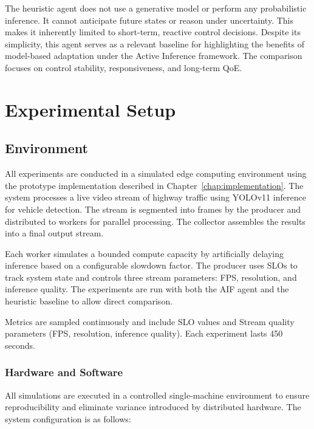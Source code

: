 The heuristic agent does not use a generative model or perform any probabilistic inference. It cannot anticipate future states or reason under uncertainty. This makes it inherently limited to short-term, reactive control decisions. Despite its simplicity, this agent serves as a relevant baseline for highlighting the benefits of model-based adaptation under the Active Inference framework. The comparison focuses on control stability, responsiveness, and long-term QoE.

\section{Experimental Setup}
\label{sec:evaluation-setup}

\subsection{Environment}
\label{sec:evaluation-environment}

All experiments are conducted in a simulated edge computing environment using the prototype implementation described in Chapter~\ref{chap:implementation}. The system processes a live video stream of highway traffic using YOLOv11 inference for vehicle detection. The stream is segmented into frames by the producer and distributed to workers for parallel processing. The collector assembles the results into a final output stream.

Each worker simulates a bounded compute capacity by artificially delaying inference based on a configurable slowdown factor. The producer uses SLOs to track system state and controls three stream parameters: FPS, resolution, and inference quality. The experiments are run with both the AIF agent and the heuristic baseline to allow direct comparison.

Metrics are sampled continuously and include SLO values and Stream quality parameters (FPS, resolution, inference quality). Each experiment lasts 450 seconds.

\subsubsection{Hardware and Software}
All simulations are executed in a controlled single-machine environment to ensure reproducibility and eliminate variance introduced by distributed hardware. The system configuration is as follows:

